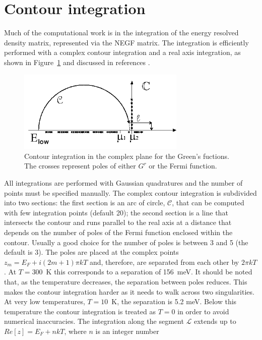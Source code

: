 \section{Contour integration}

Much of the computational work is in the integration of the energy resolved
density matrix, represented via the NEGF matrix. The integration is efficiently
performed with a complex contour integration and a real axis integration, as
shown in Figure~\ref{fig:contour} and discussed in references \cite{Pecchia_RPP,
  Pecchia_spring, Pecchia_NJP}.
\begin{figure}[!h]
\begin{center}
\includegraphics[width=8.0cm]{Fig_integration.png}
\caption{ \label{fig:contour} Contour integration in the complex plane for the
  Green's fuctions. The crosses represent poles of either $G^r$ or the Fermi
  function.}
\end{center}
\end{figure}
All integrations are performed with Gaussian quadratures and the number of
points must be specified manually. The complex contour integration is subdivided
into two sections: the first section is an arc of circle, $\mathcal{C}$, that
can be computed with few integration points (default 20); the second section is
a line that intersects the contour and runs parallel to the real axis at a
distance that depends on the number of poles of the Fermi function enclosed
within the contour. Usually a good choice for the number of poles is between 3
and 5 (the default is 3). The poles are placed at the complex points $z_m = E_F
+ i (2m+1) \pi k T$ and, therefore, are separated from each other by $2 \pi k
T$.  At $T=300$~K this corresponds to a separation of 156~meV. It should be
noted that, as the temperature decreases, the separation between poles
reduces. This makes the contour integration harder as it needs to walk across
two singularities. At very low temperatures, $T=10$~K, the separation is 5.2
meV. Below this temperature the contour integration is treated as $T=0$ in order
to avoid numerical inaccuracies. The integration along the segment $\mathcal{L}$
extends up to $Re\left[ z \right]=E_F+nkT$, where $n$ is an integer number
